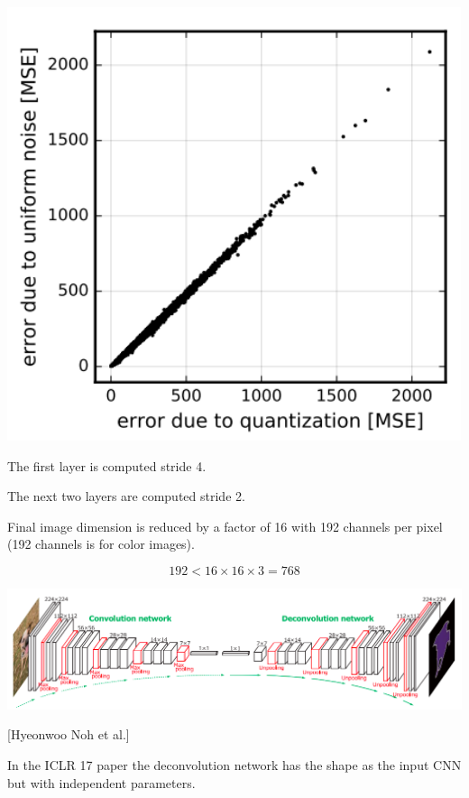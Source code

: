 {\centerline{\includegraphics[height=5in]{../images/RateDist5}}


\vfill
The first layer is computed stride 4.

\vfill
The next two layers are computed stride 2.

\vfill
Final image dimension is reduced by a factor of 16 with 192 channels per pixel (192 channels is for color images).

\vfill
$$192 < 16 \times 16 \times 3 = 768$$

\vfill



\centerline{\includegraphics[width=9in]{../images/Deconv}}
\centerline{[Hyeonwoo Noh et al.]}

\vfill
In the ICLR 17 paper the deconvolution network has the shape as the input CNN but with independent parameters.


}
